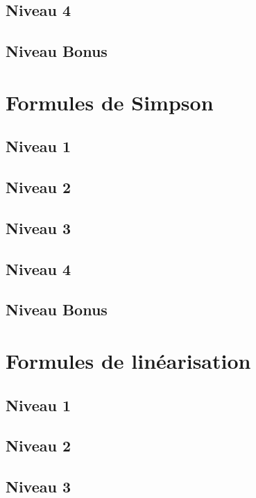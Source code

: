 \documentclass[a4paper]{report}
\begin{document}
			\subsection{Niveau 4}
			
			\subsection{Niveau Bonus}
		
		\section{Formules de Simpson}
		
			\subsection{Niveau 1}
		
			\subsection{Niveau 2}
		
			\subsection{Niveau 3}
			
			\subsection{Niveau 4}
			
			\subsection{Niveau Bonus}
		
		\section{Formules de linéarisation}
		
			\subsection{Niveau 1}
		
			\subsection{Niveau 2}
		
			\subsection{Niveau 3}
			
\end{document}
